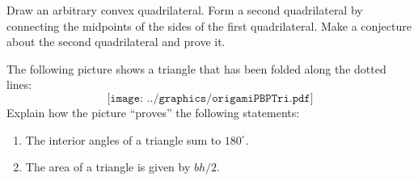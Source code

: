 \begin{prob}
Draw an arbitrary convex quadrilateral.  Form a second quadrilateral by connecting the midpoints of the sides 
of the first quadrilateral.  Make a conjecture about the second quadrilateral and prove it.  
\end{prob}

\begin{prob}
The following picture shows a triangle that has been folded
  along the dotted lines:
\[
\texttt{[image: ../graphics/origamiPBPTri.pdf]}
\]
Explain how the picture ``proves'' the following statements:
\begin{enumerate}
\item The interior angles of a triangle sum to $180^\circ$. 
\item The area of a triangle is given by $bh/2$. 
\end{enumerate}
\end{prob}
